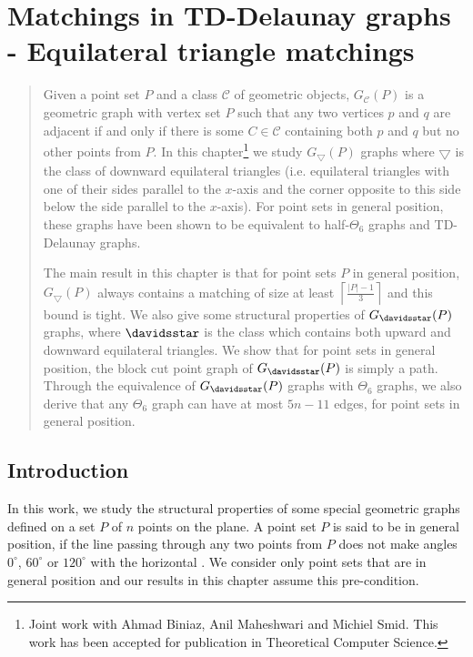 \chapter[Matchings in TD-Delaunay graphs]{Matchings in TD-Delaunay graphs - Equilateral triangle matchings}\label{ch:Delaunay}
\begin{quotation}
Given a point set $P$ and a class $\mathcal{C}$ of geometric objects, $G_\mathcal{C}(P)$ is a geometric graph with vertex set $P$ such that any two 
vertices $p$ and $q$ are adjacent if and only if there is some $C \in \mathcal{C}$ containing both $p$ and $q$ but no other points from $P$. 
In this chapter\footnote{Joint work with Ahmad Biniaz, Anil Maheshwari and Michiel Smid. This work has been accepted for publication in Theoretical Computer Science.} we study $G_{\bigtriangledown}(P)$ graphs where $\bigtriangledown$ is the class of downward equilateral triangles (i.e. equilateral triangles with 
one of their sides parallel to the $x$-axis and the corner opposite to this side below the side parallel to the $x$-axis). 
For point sets in general position, these graphs 
have been shown to be equivalent to half-$\Theta_6$ graphs and TD-Delaunay graphs. 

The main result in this chapter is that for point sets $P$ in general position, $G_{\bigtriangledown}(P)$ always contains a matching of size at least 
$\left\lceil\frac{|P|-1}{3}\right\rceil$ and this bound is tight. We also give some structural properties of $G_{\davidsstar}(P)$ graphs, 
where $\davidsstar$ is the class which contains both upward and downward equilateral triangles. We show that for point sets in general position, 
the block cut point graph of $G_{\davidsstar}(P)$ is simply a path. Through the equivalence of $G_{\davidsstar}(P)$ graphs with $\Theta_6$ graphs, 
we also derive that any $\Theta_6$ graph can have at most $5n-11$ edges, for point sets in general position.
\end{quotation}
\section{Introduction}
In this work, we study the structural properties of some special geometric graphs defined on a set $P$ of $n$ points on the plane. 
A point set $P$ is said to be in general position, if the line passing through any two points from $P$ does not make angles $0^\circ$, $60 ^\circ$ or 
$120^\circ$ with the horizontal \cite{Bonichon2010,Panahi}. We consider only point sets that are in general position and our results 
in this chapter assume this pre-condition.  

